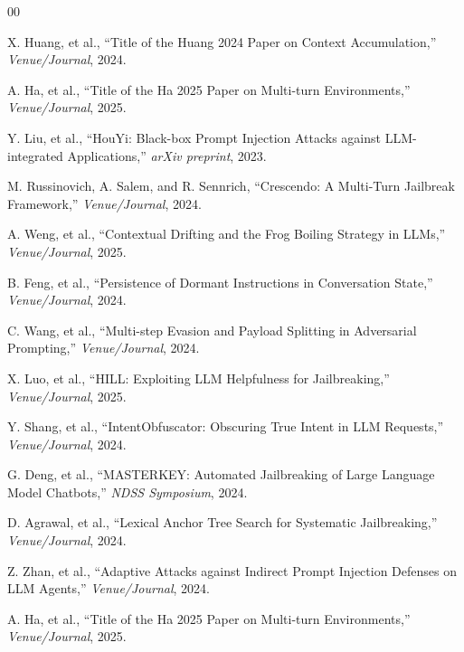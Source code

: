 \documentclass[10pt, a4paper, twocolumn]{article}
\begin{document}

\begin{thebibliography}{00}

X. Huang, et al., ``Title of the Huang 2024 Paper on Context Accumulation,'' \textit{Venue/Journal}, 2024.

A. Ha, et al., ``Title of the Ha 2025 Paper on Multi-turn Environments,'' \textit{Venue/Journal}, 2025.

Y. Liu, et al., ``HouYi: Black-box Prompt Injection Attacks against LLM-integrated Applications,'' \textit{arXiv preprint}, 2023.

M. Russinovich, A. Salem, and R. Sennrich, ``Crescendo: A Multi-Turn Jailbreak Framework,'' \textit{Venue/Journal}, 2024.

A. Weng, et al., ``Contextual Drifting and the Frog Boiling Strategy in LLMs,'' \textit{Venue/Journal}, 2025.

B. Feng, et al., ``Persistence of Dormant Instructions in Conversation State,'' \textit{Venue/Journal}, 2024.

C. Wang, et al., ``Multi-step Evasion and Payload Splitting in Adversarial Prompting,'' \textit{Venue/Journal}, 2024.

X. Luo, et al., ``HILL: Exploiting LLM Helpfulness for Jailbreaking,'' \textit{Venue/Journal}, 2025.

Y. Shang, et al., ``IntentObfuscator: Obscuring True Intent in LLM Requests,'' \textit{Venue/Journal}, 2024.

G. Deng, et al., ``MASTERKEY: Automated Jailbreaking of Large Language Model Chatbots,'' \textit{NDSS Symposium}, 2024. %

D. Agrawal, et al., ``Lexical Anchor Tree Search for Systematic Jailbreaking,'' \textit{Venue/Journal}, 2024. %

Z. Zhan, et al., ``Adaptive Attacks against Indirect Prompt Injection Defenses on LLM Agents,'' \textit{Venue/Journal}, 2024. %

A. Ha, et al., ``Title of the Ha 2025 Paper on Multi-turn Environments,'' \textit{Venue/Journal}, 2025.


\end{thebibliography}
\end{document}
